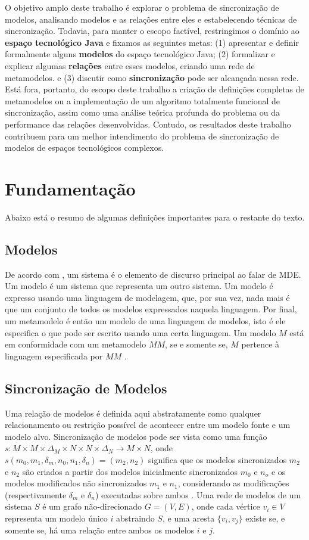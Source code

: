 \documentclass[cic,resumo-unibral]{iiufrgs}
\begin{document}
\begin{extendedsummary}
O objetivo amplo deste trabalho é explorar o problema de sincronização de modelos, analisando modelos e as relações entre eles e estabelecendo técnicas de sincronização. Todavia, para manter o escopo factível, restringimos o domínio ao \textbf{espaço tecnológico Java} e fixamos as seguintes metas: (1) apresentar e definir formalmente alguns \textbf{modelos} do espaço tecnológico Java; (2) formalizar e explicar algumas \textbf{relações} entre esses modelos, criando uma rede de metamodelos. e (3) discutir como \textbf{sincronização} pode ser alcançada nessa rede. Está fora, portanto, do escopo deste trabalho a criação de definições completas de metamodelos ou a implementação de um algoritmo totalmente funcional de sincronização, assim como uma análise teórica profunda do problema ou da performance das relações desenvolvidas. Contudo, os resultados deste trabalho contribuem para um melhor intendimento do problema de sincronização de modelos de espaços tecnológicos complexos.

\section{Fundamentação}
Abaixo está o resumo de algumas definições importantes para o restante do texto.

\subsection{Modelos}
De acordo com \citet{favre2004foundations}, um sistema é o elemento de discurso principal ao falar de MDE. Um modelo é um sistema que representa um outro sistema. Um modelo é expresso usando uma linguagem de modelagem, que, por sua vez, nada mais é que um conjunto de todos os modelos expressados naquela linguagem. Por final, um metamodelo é então um modelo de uma linguagem de modelos, isto é ele especifica o que pode ser escrito usando uma certa linguagem. Um modelo $M$ está em conformidade com um metamodelo $MM$, se e somente se, $M$ pertence à linguagem especificada por $MM$ \cite{favre2004foundations2}.

\subsection{Sincronização de Modelos}
Uma relação de modelos é definida aqui abstratamente como qualquer relacionamento ou restrição possível de acontecer entre um modelo fonte e um modelo alvo. Sincronização de modelos pode ser vista como uma função $s : M \times M \times \Delta_M \times N \times N \times \Delta_N \rightarrow M \times N $, onde $s(m_0,m_1,\delta_m,n_0,n_1,\delta_n) = (m_2,n_2)$ significa que os modelos sincronizados $m_2$ e $n_2$ são criados a partir dos modelos inicialmente sincronizados $m_0$ e $n_o$ e os modelos modificados não sincronizados $m_1$ e $n_1$, considerando as modificações (respectivamente $\delta_m$ e $\delta_n$) executadas sobre ambos \cite{diskin2011model}. Uma rede de modelos de um sistema $S$ é um grafo não-direcionado $G = (V,E)$, onde cada vértice $v_i \in V$ representa um modelo único $i$ abstraindo $S$, e uma aresta $\{v_i, v_j\}$ existe se, e somente se, há uma relação entre ambos os modelos $i$ e $j$.


\end{extendedsummary}
\end{document}
